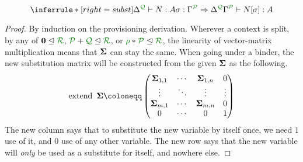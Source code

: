 \begin{lemma}[Substitution]
  \[
    \inferrule*[right=subst]{
      \ctx{\Delta}{Q} \vdash N : A
      \\ \sigma : \ctx{\Gamma}{P} \Rightarrow \ctx{\Delta}{Q}
    }
    {
      \ctx{\Gamma}{P} \vdash N[\sigma] : A
    }
  \]
\end{lemma}
\renewcommand{\proofname}{Proof sketch}
\begin{proof}
  By induction on the provisioning derivation.
  Wherever a context is split, by any of $\vct 0 \subres \resctx R$,
  $\resctx P + \resctx Q \subres \resctx R$, or
  $\rescomment \rho * \resctx P \subres \resctx R$, the linearity of vector-matrix
  multiplication means that $\mathbf{\Sigma}$ can stay the same.
  When going under a binder, the new substitution matrix will be constructed
  from the given $\mathbf{\Sigma}$ as the following.
  \newcommand*{\mathhuge}[1]{\mathlarger{\mathlarger{\mathlarger{\mathlarger{#1}}}}}
  \[
    \operatorname{extend}~\mat \Sigma \coloneqq
    \begin{pmatrix}
      \mat \Sigma_{1,1} & \cdots & \mat \Sigma_{1,n} & 0 \\
      \vdots & \ddots & \vdots & \vdots \\
      \mat \Sigma_{m,1} & \cdots & \mat \Sigma_{m,n} & 0 \\
      0 & \cdots & 0 & 1
    \end{pmatrix}
  \]
  The new column says that to substitute the new variable by itself once, we
  need $1$ use of it, and $0$ use of any other variable.
  The new row says that the new variable will \emph{only} be used as a
  substitute for itself, and nowhere else.
\end{proof}
\renewcommand{\proofname}{Proof}

